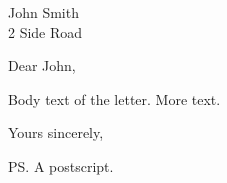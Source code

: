 \documentclass[11pt]{scrlttr2}
\date{2026-09-28}
\begin{document}

\begin{letter}{%
John Smith\\
2 Side Road}

\opening{Dear John,}

Body text of the letter.
More text.
\closing{Yours sincerely,}
\vspace{2em}
\ps{A postscript.}



\end{letter}
\end{document}
